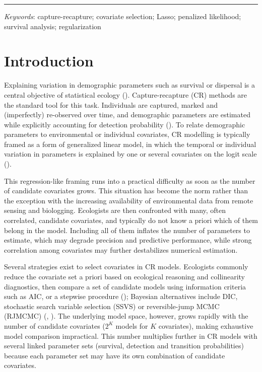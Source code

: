 \documentclass[
  11pt,
  a4paper,
]{article}
\begin{document}
\vspace{3mm}
\hrule
\vspace{5mm}

\emph{Keywords}: capture-recapture; covariate selection; Lasso; penalized likelihood; survival analysis; regularization

\newpage

\section{Introduction}\label{introduction}

Explaining variation in demographic parameters such as survival or dispersal is a central objective of statistical ecology (). Capture-recapture (CR) methods are the standard tool for this task. Individuals are captured, marked and (imperfectly) re-observed over time, and demographic parameters are estimated while explicitly accounting for detection probability (). To relate demographic parameters to environmental or individual covariates, CR modelling is typically framed as a form of generalized linear model, in which the temporal or individual variation in parameters is explained by one or several covariates on the logit scale ().

This regression-like framing runs into a practical difficulty as soon as the number of candidate covariates grows. This situation has become the norm rather than the exception with the increasing availability of environmental data from remote sensing and biologging. Ecologists are then confronted with many, often correlated, candidate covariates, and typically do not know a priori which of them belong in the model. Including all of them inflates the number of parameters to estimate, which may degrade precision and predictive performance, while strong correlation among covariates may further destabilizes numerical estimation.

Several strategies exist to select covariates in CR models. Ecologists commonly reduce the covariate set a priori based on ecological reasoning and collinearity diagnostics, then compare a set of candidate models using information criteria such as AIC, or a stepwise procedure (); Bayesian alternatives include DIC, stochastic search variable selection (SSVS) or reversible-jump MCMC (RJMCMC) (, ). The underlying model space, however, grows rapidly with the number of candidate covariates (\(2^K\) models for \(K\) covariates), making exhaustive model comparison impractical. This number multiplies further in CR models with several linked parameter sets (survival, detection and transition probabilities) because each parameter set may have its own combination of candidate covariates.
\end{document}
